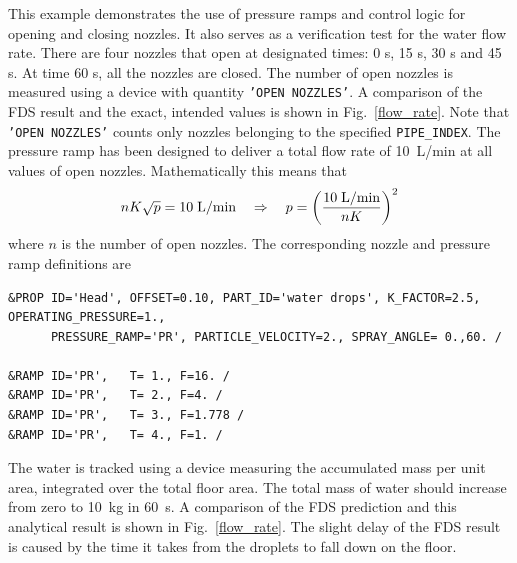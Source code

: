 \documentclass[11pt]{book}
\newcommand{\ct}{\tt\small}
\newcommand{\be}{\begin{equation}}
\newcommand{\ee}{\end{equation}}
\begin{document}
This example demonstrates the use of pressure ramps and control logic for opening and closing nozzles. It also serves as a verification test for
the water flow rate. There are four nozzles that open at designated times: 0 s, 15 s, 30 s and 45 s. At time 60 s, all the nozzles are closed.
The number of open nozzles is measured using a device with quantity {\ct 'OPEN NOZZLES'}. A comparison of the FDS result and the exact, intended values
is shown in Fig.~\ref{flow_rate}.  Note that {\ct 'OPEN NOZZLES'} counts only nozzles belonging to the specified {\ct PIPE\_INDEX}.
The pressure ramp has been designed to deliver a total flow rate of 10~L/min at all values of open nozzles. Mathematically this means that
\be
n K \sqrt{p} = 10 \;\hbox{L/min} \quad \Rightarrow \quad
p = \left( \frac{10 \;\hbox{L/min}}{n K}\right)^2
\ee
where $n$ is the number of open nozzles. The corresponding nozzle and pressure ramp definitions are

\footnotesize
\begin{verbatim}
&PROP ID='Head', OFFSET=0.10, PART_ID='water drops', K_FACTOR=2.5, OPERATING_PRESSURE=1.,
      PRESSURE_RAMP='PR', PARTICLE_VELOCITY=2., SPRAY_ANGLE= 0.,60. /

&RAMP ID='PR',   T= 1., F=16. /
&RAMP ID='PR',   T= 2., F=4. /
&RAMP ID='PR',   T= 3., F=1.778 /
&RAMP ID='PR',   T= 4., F=1. /
\end{verbatim}
\normalsize

\noindent The water is tracked using a device measuring the accumulated mass per unit area, integrated over the total floor area. The total mass of water should increase from zero to 10~kg in 60~s. A comparison of the FDS prediction and this analytical result is shown in Fig.~\ref{flow_rate}. The slight delay of the FDS result is caused by the time it takes from the droplets to fall down on the floor.
\end{document}
